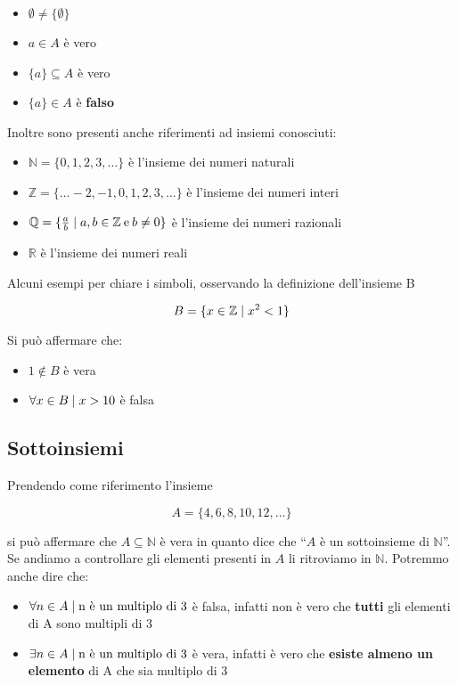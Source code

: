 \documentclass[12pt,a4paper]{article}
\newcommand{\Setsuchthat}{\;\ifnum\currentgrouptype=16 \middle\fi|\;} %
\begin{document}
  \begin{itemize}
    \item $ \emptyset \neq \{\emptyset\} $
    \item $ a \in A $ è vero
    \item $ \{a\} \subseteq A $ è vero
    \item $ \{a\} \in A $ è \textbf{falso}
  \end{itemize}

  Inoltre sono presenti anche riferimenti ad insiemi conosciuti:

  \begin{itemize}
    \item $ \mathbb{N} = \{0, 1, 2, 3, \ldots\} $ è l'insieme dei numeri naturali
    \item $ \mathbb{Z} = \{ \ldots -2, -1, 0, 1, 2, 3, \ldots\} $ è l'insieme dei numeri interi
      \item $ \mathbb{Q}  = \{\frac{a}{b} \Setsuchthat a,b \in \mathbb{Z}\:\text{e}\:b \neq 0\} $ è l'insieme dei numeri razionali
      \item $ \mathbb{R} $ è l'insieme dei numeri reali
  \end{itemize}

  Alcuni esempi per chiare i simboli, osservando la definizione dell'insieme B

  \begin{equation}
    B = \{x \in \mathbb{Z} \Setsuchthat x^{2} < 1\}
  \end{equation}

  Si può affermare che:
  \begin{itemize}
    \item $ 1 \notin B $ è vera
    \item $ \forall x \in B \Setsuchthat x > 10 $ è falsa
  \end{itemize}

  \subsection{Sottoinsiemi}
  Prendendo come riferimento l'insieme

  \begin{equation}
    A = \{4, 6, 8, 10, 12, \ldots\}
  \end{equation}

  si può affermare che $ A \subseteq \mathbb{N} $ è vera in quanto dice che ``$A$ è un sottoinsieme
  di $\mathbb{N}$''. Se andiamo a controllare gli elementi presenti in $A$ li ritroviamo
  in $\mathbb{N}$. Potremmo anche dire che:

  \begin{itemize}
    \item $ \forall n \in A \Setsuchthat \text{n è un multiplo di 3} $ è falsa, infatti non è vero che \textbf{tutti} gli elementi di A sono multipli di 3

    \item $ \exists n \in A \Setsuchthat \text{n è un multiplo di 3} $ è vera, infatti è vero che \textbf{esiste almeno un elemento} di A che sia multiplo di 3
  \end{itemize}
\end{document}
